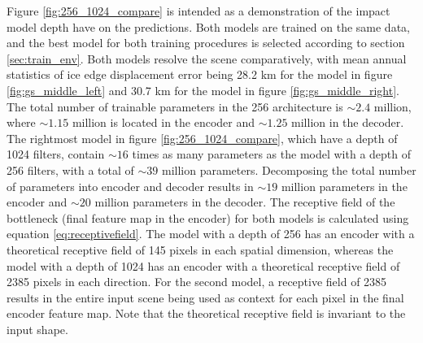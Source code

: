 \documentclass[../main/thesis]{subfiles}
\begin{document}
Figure \ref{fig:256_1024_compare} is intended as a demonstration of the impact model depth have on the predictions. Both models are trained on the same data, and the best model for both training procedures is selected according to section \ref{sec:train_env}. Both models resolve the scene comparatively, with mean annual statistics of ice edge displacement error being 28.2 km for the model in figure \ref{fig:gs_middle_left} and 30.7 km for the model in figure \ref{fig:gs_middle_right}. The total number of trainable parameters in the 256 architecture is $\sim 2.4$ million, where $\sim 1.15$ million is located in the encoder and $\sim 1.25$ million in the decoder. The rightmost model in figure \ref{fig:256_1024_compare}, which have a depth of 1024 filters, contain $\sim 16$ times as many parameters as the model with a depth of 256 filters, with a total of $\sim39 $ million parameters. Decomposing the total number of parameters into encoder and decoder results in $\sim 19$ million parameters in the encoder and $\sim 20$ million parameters in the decoder. The receptive field of the bottleneck (final feature map in the encoder) for both models is calculated using equation \ref{eq:receptivefield}. The model with a depth of 256 has an encoder with a theoretical receptive field of 145 pixels in each spatial dimension, whereas the model with a depth of 1024 has an encoder with a theoretical receptive field of 2385 pixels in each direction. For the second model, a receptive field of 2385 results in the entire input scene being used as context for each pixel in the final encoder feature map. Note that the theoretical receptive field is invariant to the input shape.
\end{document}
